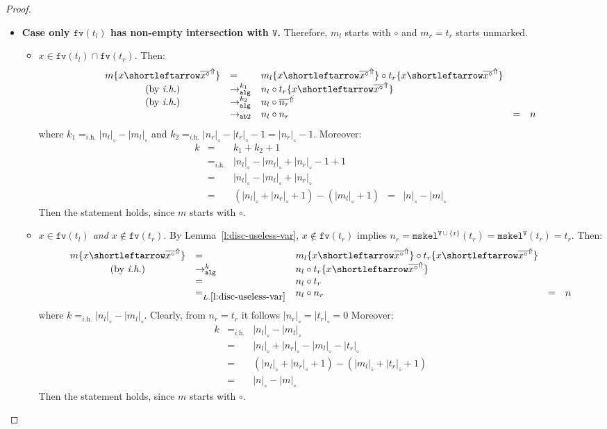 \documentclass[10pt,a4paper]{article}
\theoremstyle{remark}
\newcommand{\tm}{t}
\newcommand{\var}{x}
\newcommand{\Rew}[1]{\rightarrow_{#1}}
\newcommand{\symfont}[1]{\mathtt{#1}}
\newcommand{\isub}[2]{\{#1{\shortleftarrow}#2\}}
\newcommand{\ih}{{\textit{i.h.}}\xspace}
\newcommand{\fv}[1]{\symfont{fv}(#1)}
\newcommand{\reflemma}[1]{Lemma~\ref{l:#1}}
\newcommand{\reflemmaeq}[1]{{L.\ref{l:#1}}}
\newcommand{\sizep}[2]{|#1|_{#2}}
\newcommand{\case}[1]{{\bf Case #1.}}
\newcommand{\taken}{\circ}
\newcommand{\frontiersym}{\Uparrow}
\newcommand{\skelu}[1]{\overline{#1}^{\frontiersym}}
\newcommand{\appt}{\taken}
\newcommand{\absym}{\symfont{ab}}
\newcommand{\tomarkwhtwo}{\Rew{\absym2}}
\newcommand{\tomark}{\Rew{\symfont{alg}}}
\newcommand{\mtm}{m}
\newcommand{\mtmtwo}{n}
\newcommand{\disc}[2]{\symfont{disc}^{#2}(#1)}
\renewcommand{\disc}[2]{\symfont{mskel}^{#2}(#1)}
\newcommand{\skelvars}{\theta}
\renewcommand{\skelvars}{\symfont{V}}
\newcommand{\sizet}[1]{\sizep{#1}{\taken}}
\begin{document}
\begin{proof}
\begin{itemize}
\begin{itemize}
\item \case{only $\fv{\tm_l}$ has non-empty intersection with $\skelvars$}
Therefore, $\mtm_l$ starts with $\taken$ and $\mtm_r = \tm_r$ starts unmarked. 
\begin{itemize}
\item $\var \in \fv{\tm_l} \cap \fv{\tm_r}$. Then:
\[\begin{array}{cllllll}
\mtm\isub\var{\skelu{\var^\taken}}
  &= &
  \mtm_l\isub\var{\skelu{\var^\taken}}\appt\tm_r\isub\var{\skelu{\var^\taken}} 
  \\
    \mbox{(by \ih)} &\tomark^{k_1} &
  \mtmtwo_l\appt \tm_r\isub\var{\skelu{\var^\taken}} 
  \\
    \mbox{(by \ih)} &\tomark^{k_2} &
    \mtmtwo_l\appt\skelu{\mtmtwo_r} 
    \\
  &\tomarkwhtwo &
  \mtmtwo_l\appt\mtmtwo_r
  &= &
  \mtmtwo
\end{array}\]
where $k_1 =_{\ih} \sizet{\mtmtwo_l} - \sizet{\mtm_l}$ and $k_2 =_{\ih} \sizet{\mtmtwo_r} - \sizet{\tm_r} -1 = \sizet{\mtmtwo_r}-1$.
Moreover:
\[\begin{array}{cllllll}
k & = & k_1 + k_2 +1
\\
& =_{\ih} & 
\sizet{\mtmtwo_l} - \sizet{\mtm_l} + \sizet{\mtmtwo_r} -1 +1
\\
& = & 
\sizet{\mtmtwo_l} - \sizet{\mtm_l} + \sizet{\mtmtwo_r}
\\
& = & 
(\sizet{\mtmtwo_l} + \sizet{\mtmtwo_r} +1) - (\sizet{\mtm_l} +1)
& = & 
\sizet{\mtmtwo}-\sizet{\mtm}
\end{array}\]
Then the statement holds, since $\mtm$ starts with $\taken$.

\item \emph{$\var \in \fv{\tm_l}$ and $\var\notin\fv{\tm_r}$}. By \reflemma{disc-useless-var}, $\var \notin \fv{\tm_r}$ implies $\mtmtwo_r=\disc{\tm_r}{\skelvars \cup \{\var\}} = \disc{\tm_r}{\skelvars} = \tm_r$. Then:
\[\begin{array}{cllllll}
\mtm\isub\var{\skelu{\var^\taken}}
  &= & 
  \mtm_l\isub\var{\skelu{\var^\taken}}\appt\tm_r\isub\var{\skelu{\var^\taken}} 
  \\
   \mbox{(by \ih)}  &\tomark^{k} &
\mtmtwo_l\appt \tm_r\isub\var{\skelu{\var^\taken}} 
  \\
 &= &
  \mtmtwo_l \appt \tm_r
  \\
 &=_{\reflemmaeq{disc-useless-var}} &
  \mtmtwo_l \appt \mtmtwo_r
  &=&
  \mtmtwo
\end{array}\]
where $k =_{\ih} \sizet{\mtmtwo_l} - \sizet{\mtm_l}$.
 Clearly, from $\mtmtwo_r= \tm_r$ it follows $\sizet{\mtmtwo_r}= \sizet{\tm_r}=0$
Moreover:
\[\begin{array}{lllllll}
k & =_{\ih} & 
\sizet{\mtmtwo_l} - \sizet{\mtm_l} 
\\
& = & 
\sizet{\mtmtwo_l} +\sizet{\mtmtwo_r} - \sizet{\mtm_l} - \sizet{\tm_r}
\\
& = & 
(\sizet{\mtmtwo_l} +\sizet{\mtmtwo_r}+1) - (\sizet{\mtm_l} + \sizet{\tm_r}+1)
\\
& = & 
\sizet{\mtmtwo} - \sizet{\mtm}
\end{array}\]
Then the statement holds, since $\mtm$ starts with $\taken$.


\end{itemize}
\end{itemize}
\end{itemize}
\end{proof}
\end{document}
